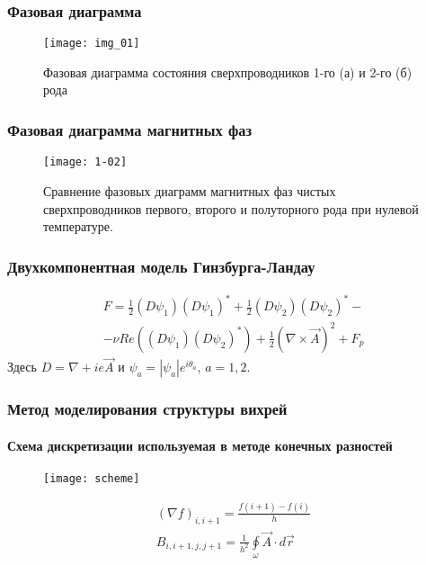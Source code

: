 \begin{frame}
    \frametitle{Фазовая диаграмма}
    \begin{figure}[h]
        \center
        \texttt{[image: img\_01]}
        \caption{Фазовая диаграмма состояния сверхпроводников 1-го (а) и 
            2-го (б) рода}
    \end{figure}
\end{frame}

\begin{frame}
    \frametitle{Фазовая диаграмма магнитных фаз}
    \begin{figure}[h]
        \center
        \texttt{[image: 1-02]}
        \caption{Сравнение фазовых диаграмм магнитных фаз чистых 
            сверхпроводников первого, второго и полуторного рода при нулевой 
            температуре.}
    \end{figure}
\end{frame}

\begin{frame}
    \frametitle{Двухкомпонентная модель Гинзбурга-Ландау}
    \begin{gather}
        F = \frac{1}{2}(D\psi_1)(D\psi_1)^* + \frac{1}{2}(D\psi_2)(D\psi_2)^* - 
            \nonumber \\ - \nu Re\left( (D\psi_1)(D\psi_2)^* \right) +
            \frac{1}{2}\left(\nabla\times\vec{A}\right)^2 + F_p
    \end{gather}
    Здесь \( D = \nabla + ie\vec{A} \) и \( \psi_a = |\psi_a|e^{i\theta_a} \), 
    \( a = 1,2 \).
\end{frame}

\begin{frame}
    \frametitle{Метод моделирования структуры вихрей}
    \framesubtitle{Схема дискретизации используемая в методе конечных разностей}
    \begin{figure}[h]
        \begin{minipage}[h]{0.4\linewidth}
            \center
            \texttt{[image: scheme]}
        \end{minipage}
        \begin{minipage}[h]{0.5\linewidth}
            \begin{gather}
            \left( \nabla f \right)_{i,i+1} = \frac{f(i+1)-f(i)}{h} \\
            B_{i,i+1,j,j+1} = \frac{1}{h^2}\oint\limits_{\omega} 
                \vec{A} \cdot d\vec{r}
            \end{gather}
        \end{minipage}
    \end{figure}
\end{frame}

